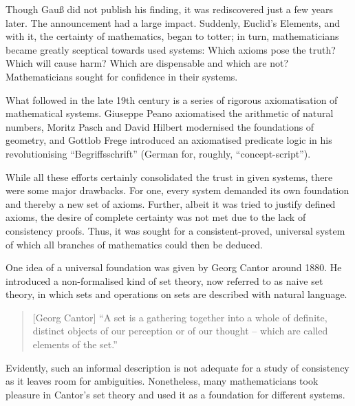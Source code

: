 \documentclass{article}
\begin{document}
Though Gauß did not publish his finding, it was rediscovered just a few years later. The announcement had a large impact. Suddenly, Euclid's Elements, and with it, the certainty of mathematics, began to totter; in turn, mathematicians became greatly sceptical towards used systems: Which axioms pose the truth? Which will cause harm? Which are dispensable and which are not? Mathematicians sought for confidence in their systems.

What followed in the late 19th century is a series of rigorous axiomatisation of mathematical systems. Giuseppe Peano axiomatised the arithmetic of natural numbers, Moritz Pasch and David Hilbert modernised the foundations of geometry, and Gottlob Frege introduced an axiomatised predicate logic in his revolutionising ``Begriffsschrift'' (German for, roughly, ``concept-script'').

While all these efforts certainly consolidated the trust in given systems, there were some major drawbacks. For one, every system demanded its own foundation and thereby a new set of axioms. Further, albeit it was tried to justify defined axioms, the desire of complete certainty was not met due to the lack of consistency proofs. Thus, it was sought for a consistent-proved, universal system of which all branches of mathematics could then be deduced.

One idea of a universal foundation was given by Georg Cantor around 1880. He introduced a non-formalised kind of set theory, now referred to as naive set theory, in which sets and operations on sets are described with natural language. 
\begin{quote}[Georg Cantor]
``A set is a gathering together into a whole of definite, distinct objects of our perception or of our thought -- which are called elements of the set.''\cite{cantor_set}
\end{quote}
Evidently, such an informal description is not adequate for a study of consistency as it leaves room for ambiguities. Nonetheless, many mathematicians took pleasure in Cantor's set theory and used it as a foundation for different systems.
\end{document}
